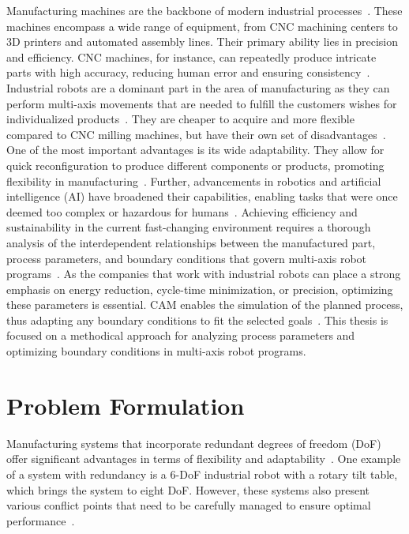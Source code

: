 Manufacturing machines are the backbone of modern industrial processes~\cite{Bi.2020}. These machines encompass a wide range of equipment, from CNC machining centers to 3D printers and automated assembly lines. Their primary ability lies in precision and efficiency. CNC machines, for instance, can repeatedly produce intricate parts with high accuracy, reducing human error and ensuring consistency~\cite{Jia.2018}. \newline
Industrial robots are a dominant part in the area of manufacturing as they can perform multi-axis movements that are needed to fulfill the customers wishes for individualized products~\cite{Sherwani.2020}. They are cheaper to acquire and more flexible compared to CNC milling machines, but have their own set of disadvantages~\cite{Iglesias.2015}. One of the most important advantages is its wide adaptability. They allow for quick reconfiguration to produce different components or products, promoting flexibility in manufacturing~\cite{Billard.2019}. Further, advancements in robotics and artificial intelligence (AI) have broadened their capabilities, enabling tasks that were once deemed too complex or hazardous for humans~\cite{Goel.2020}. \newline
Achieving efficiency and sustainability in the current fast-changing environment requires a thorough analysis of the interdependent relationships between the manufactured part, process parameters, and boundary conditions that govern multi-axis robot programs~\cite{Pan, Gadaleta.2019}. As the companies that work with industrial robots can place a strong emphasis on energy reduction, cycle-time minimization, or precision, optimizing these parameters is essential. CAM enables the simulation of the planned process, thus adapting any boundary conditions to fit the selected goals~\cite{Kyratsis.2020,Maiti.2017,Pan,Uhlmann.2016}.
This thesis is focused on a methodical approach for analyzing process parameters and optimizing boundary conditions in multi-axis robot programs. 

\section{Problem Formulation}\label{Problem Formulation}
Manufacturing systems that incorporate redundant degrees of freedom (DoF) offer significant advantages in terms of flexibility and adaptability~\cite{Anjum.2022}. One example of a system with redundancy is a 6-DoF industrial robot with a rotary tilt table, which brings the system to eight DoF. However, these systems also present various conflict points that need to be carefully managed to ensure optimal performance~\cite{Boscariol.2020, Liu.2022}.


